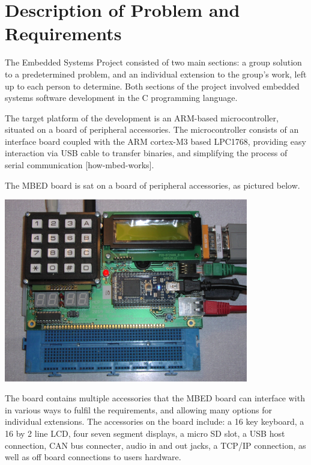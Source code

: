 \section{Description of Problem and Requirements}
The Embedded Systems Project consisted of two main sections: a group solution 
to a predetermined problem, and an individual extension to the group's work, 
left up to each person to determine. Both sections of the project involved 
embedded systems software development in the C programming language. 

The target platform of the development is an ARM-based microcontroller, 
situated on a board of peripheral accessories. The microcontroller consists of 
an interface board coupled with the ARM cortex-M3 based LPC1768, providing easy 
interaction via USB cable to transfer binaries, and simplifying the process of 
serial communication [how-mbed-works].
\par\bigskip\noindent
The MBED board is sat on a board of peripheral accessories, as pictured below. 
\par\bigskip
\includegraphics[width=0.80\textwidth]{./mbed_board}
\par\bigskip\noindent
The board contains multiple accessories that the MBED board can interface with 
in various ways to fulfil the requirements, and allowing many options for 
individual extensions. The accessories on the board include: a 16 key keyboard, 
a 16 by 2 line LCD, four seven segment displays, a micro SD slot, a USB host 
connection, CAN bus connecter, audio in and out jacks, a TCP/IP connection, as 
well as off board connections to users hardware. 

